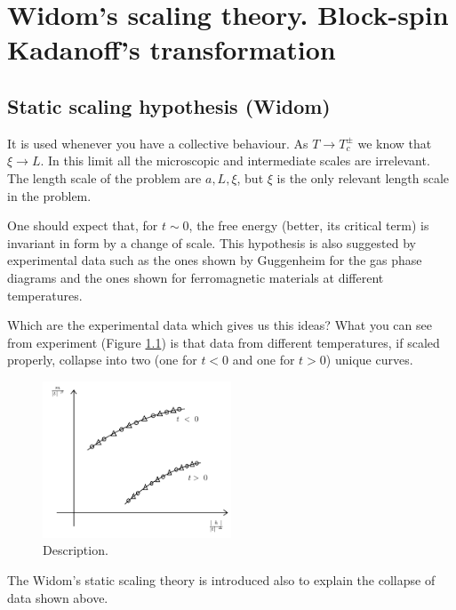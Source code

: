 \documentclass[../main/main.tex]{subfiles}
\begin{document}
\chapter{Widom's scaling theory. Block-spin Kadanoff's transformation}


\section{Static scaling hypothesis (Widom)}
It is used whenever you have a collective behaviour.
As \( T \rightarrow T_c^{\pm} \) we know that \( \xi \rightarrow L \). In this limit all the microscopic and intermediate scales are irrelevant. The length scale of the problem are \( a,L,\xi  \), but  \( \xi  \) is the only relevant length scale in the problem.

One should expect that, for \( t \sim 0 \), the free energy (better, its critical term) is invariant in form by a change of scale. This hypothesis is also suggested by experimental data such as the ones shown by Guggenheim for the gas phase diagrams and the ones shown for ferromagnetic materials at different temperatures.

Which are the experimental data which gives us this ideas? What you can see from experiment (Figure \ref{fig:19_1}) is that data from different temperatures, if scaled properly, collapse into two (one for \( t<0 \) and one for \( t>0 \)) unique curves.


\begin{figure}[h!]
\centering
\includegraphics[width=0.5\textwidth]{../lessons/19_image/1.pdf}
\caption{\label{fig:19_1} Description.}
\end{figure}

The Widom's static scaling theory is introduced also to explain the collapse of data shown above.
\end{document}
